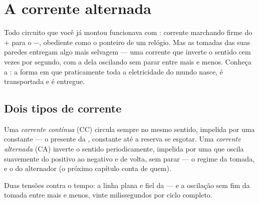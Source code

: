 \chapter{A corrente alternada}\label{ch:g9:alternating-current}

Todo circuito que você já montou funcionava com : corrente
marchando firme do $+$ para o $-$, obediente como o ponteiro de um
relógio. Mas as tomadas das suas paredes entregam algo mais selvagem
--- uma corrente que inverte o sentido cem vezes por segundo, com a
 dela oscilando sem parar entre mais e menos. Conheça a
: a forma em que praticamente toda a eletricidade
do mundo nasce, é transportada e é entregue.

\section{Dois tipos de corrente}

\begin{definition}\label{def:g9:alternating-current:dcac}
Uma \emph{corrente contínua} (CC) circula
sempre no mesmo sentido, impelida por uma  constante --- o
presente da , constante até a reserva se esgotar. Uma
\emph{corrente alternada} (CA) inverte o
sentido periodicamente, impelida por uma  que oscila suavemente
do positivo ao negativo e de volta, sem parar --- o regime da tomada,
e o do alternador (o próximo capítulo conta de quem).
\end{definition}

\begin{omfigure}

{\small Duas tensões contra o tempo: a linha plana e fiel da  ---
e a oscilação sem fim da tomada entre mais e menos, vinte
milissegundos por ciclo completo.}
\end{omfigure}

